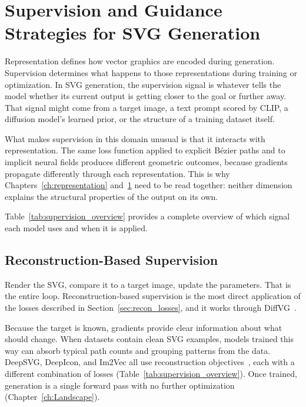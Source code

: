 \chapter{Supervision and Guidance Strategies for SVG Generation}
\label{ch:supervision}

Representation defines how vector graphics are encoded during generation. Supervision determines what happens to those representations during training or optimization. In SVG generation, the supervision signal is whatever tells the model whether its current output is getting closer to the goal or further away. That signal might come from a target image, a text prompt scored by CLIP, a diffusion model's learned prior, or the structure of a training dataset itself.

What makes supervision in this domain unusual is that it interacts with representation. The same loss function applied to explicit B\'{e}zier paths and to implicit neural fields produces different geometric outcomes, because gradients propagate differently through each representation. This is why Chapters~\ref{ch:representation} and~\ref{ch:supervision} need to be read together: neither dimension explains the structural properties of the output on its own.

Table~\ref{tab:supervision_overview} provides a complete overview of which signal each model uses and when it is applied.


\section{Reconstruction-Based Supervision}
\label{sec:recon_supervision}

Render the SVG, compare it to a target image, update the parameters. That is the entire loop. Reconstruction-based supervision is the most direct application of the losses described in Section~\ref{sec:recon_losses}, and it works through DiffVG~\cite{liDifferentiableVectorGraphics2020a}.

Because the target is known, gradients provide clear information about what should change. When datasets contain clean SVG examples, models trained this way can absorb typical path counts and grouping patterns from the data. DeepSVG, DeepIcon, and Im2Vec all use reconstruction objectives~\cite{carlierDeepSVGHierarchicalGenerative2020, bingDeepIconHierarchicalNetwork2024, reddyIm2VecSynthesizingVector2021}, each with a different combination of losses (Table~\ref{tab:supervision_overview}). Once trained, generation is a single forward pass with no further optimization (Chapter~\ref{ch:Landscape}).

